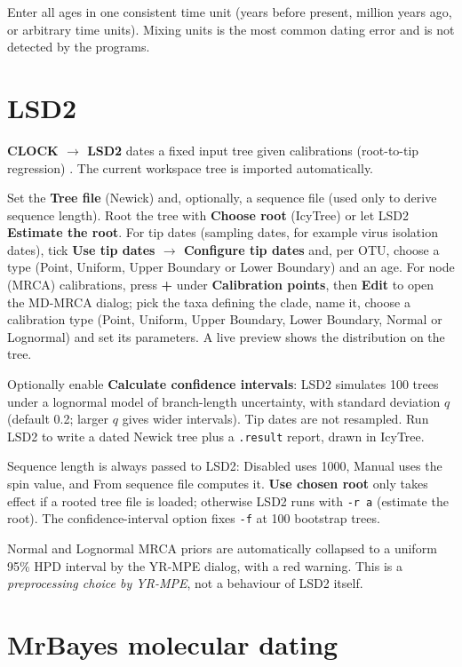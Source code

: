 \documentclass[10pt]{report}
\begin{document}
Enter all ages in one consistent time unit (years before present, million
years ago, or arbitrary time units). Mixing units is the most common dating
error and is not detected by the programs.

\section{LSD2}

\textbf{CLOCK $\rightarrow$ LSD2} dates a fixed input tree given calibrations
(root-to-tip regression) \cite{lsd2}. The current workspace tree is imported automatically.

Set the \textbf{Tree file} (Newick) and, optionally, a sequence file (used only
to derive sequence length). Root the tree with \textbf{Choose root} (IcyTree)
or let LSD2 \textbf{Estimate the root}. For tip dates (sampling dates, for
example virus isolation dates), tick \textbf{Use tip dates $\rightarrow$
Configure tip dates} and, per OTU, choose a type (Point, Uniform, Upper
Boundary or Lower Boundary) and an age. For node (MRCA) calibrations, press
\textbf{+} under \textbf{Calibration points}, then \textbf{Edit} to open the
MD-MRCA dialog; pick the taxa defining the clade, name it, choose a calibration
type (Point, Uniform, Upper Boundary, Lower Boundary, Normal or Lognormal) and
set its parameters. A live preview shows the distribution on the tree.

Optionally enable \textbf{Calculate confidence intervals}: LSD2 simulates 100
trees under a lognormal model of branch-length uncertainty, with standard
deviation $q$ (default 0.2; larger $q$ gives wider intervals). Tip dates are
not resampled. Run LSD2 to write a dated Newick tree plus a \texttt{.result}
report, drawn in IcyTree.

Sequence length is always passed to LSD2: Disabled uses 1000, Manual uses the
spin value, and From sequence file computes it. \textbf{Use chosen root} only
takes effect if a rooted tree file is loaded; otherwise LSD2 runs with
\texttt{-r a} (estimate the root). The confidence-interval option fixes
\texttt{-f} at 100 bootstrap trees.

\begin{warning}
Normal and Lognormal MRCA priors are automatically collapsed to a uniform 95\%
HPD interval by the YR-MPE dialog, with a red warning. This is a
\emph{preprocessing choice by YR-MPE}, not a behaviour of LSD2 itself.
\end{warning}

\section{MrBayes molecular dating}
\end{document}
